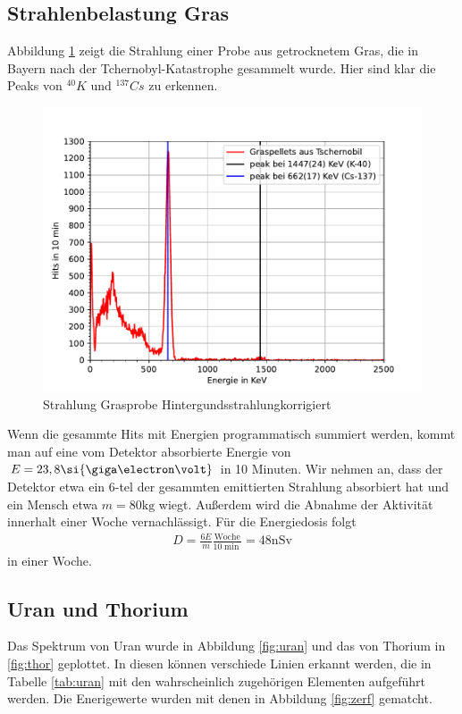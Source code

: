 \documentclass[11pt, a4paper]{article}
\begin{document}
    \FloatBarrier
    \subsection{Strahlenbelastung Gras}
    Abbildung \ref{fig:gras} zeigt die Strahlung einer Probe aus getrocknetem Gras, die in Bayern nach der Tchernobyl-Katastrophe gesammelt wurde. Hier sind klar die Peaks von $^{40}K$ und $^{137}Cs$ zu erkennen.
    \begin{figure}[!h]
        \centering
        \includegraphics[width=\textwidth]{Plots/Tschern.pdf}
        \caption{Strahlung Grasprobe Hintergundsstrahlungkorrigiert}
        \label{fig:gras}
    \end{figure}
    Wenn die gesammte Hits mit Energien programmatisch summiert werden, kommt man auf eine vom Detektor absorbierte Energie von $E = 23,8 \si{\giga\electron\volt}$ in 10 Minuten. Wir nehmen an, dass der Detektor etwa ein 6-tel der gesammten emittierten Strahlung absorbiert hat und ein Mensch etwa $m = 80 \si{\kilogram}$ wiegt. Außerdem wird die Abnahme der Aktivität innerhalt einer Woche vernachlässigt. Für die Energiedosis folgt
    \begin{align}
        D = \frac{6 E}{m} \frac{\text{Woche}}{10 \si{\min}} = 48 \si{\nano\sievert}
    \end{align}
    in einer Woche.



    \FloatBarrier
    \subsection{Uran und Thorium}
    Das Spektrum von Uran wurde in Abbildung \ref{fig:uran} und das von Thorium in \ref{fig:thor} geplottet. In diesen können verschiede Linien erkannt werden, die in Tabelle \ref{tab:uran} mit den wahrscheinlich zugehörigen Elementen aufgeführt werden. Die Enerigewerte wurden mit denen in Abbildung \ref{fig:zerf} gematcht.
\end{document}
